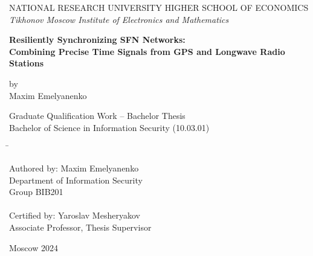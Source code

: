 \documentclass[12pt, a4paper]{extarticle}
\date{\today}
\begin{document}
\begin{titlepage}
{\small
    \begin{center}
         NATIONAL RESEARCH UNIVERSITY HIGHER SCHOOL OF ECONOMICS
        \\
        \textit{Tikhonov Moscow Institute of Electronics and Mathematics}
   \end{center}

	\vfill

	\begin{center}
		\textbf{
            Resiliently Synchronizing SFN Networks: \\Combining Precise Time Signals from GPS and Longwave Radio Stations
        }

        \vspace{1em}

        by \\
        Maxim Emelyanenko
	\end{center}

    \vspace{1.5em}

	\begin{center}
        Graduate Qualification Work -- Bachelor Thesis\\
        Bachelor of Science in Information Security (10.03.01)
	\end{center}

	\vfill

    \begin{tabbing}
    \hspace{1.35in} \= \hspace{1in} \kill

    Authored by: \> Maxim Emelyanenko \\
                 \> Department of Information Security \\
                 \> Group BIB201 \\

    \vspace{2em} \\

    Certified by: \> Yaroslav Mesheryakov \\
                  \> Associate Professor, Thesis Supervisor \\
    \end{tabbing}

	\begin{center}
		Moscow 2024
	\end{center}
}

\end{titlepage}
\end{document}
